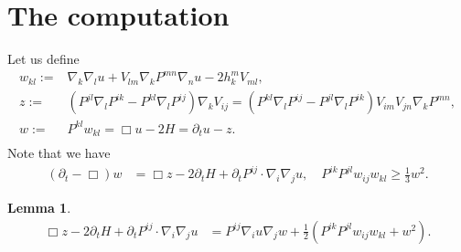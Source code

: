 \documentclass{amsart}
\newtheorem{lemma}[theorem]{Lemma}
\theoremstyle{definition}
\theoremstyle{remark}
\numberwithin{equation}{section}
\begin{document}
\section{The computation}
Let us define
\begin{align*}
w_{kl}:=&\nabla_k\nabla_lu+V_{lm}\nabla_kP^{mn}\nabla_nu-2h_k^mV_{ml},\\
z:=&\left(P^{jl}\nabla_lP^{ik}-P^{kl}\nabla_l P^{ij}\right)\nabla_kV_{ij}=\left(P^{kl}\nabla_l P^{ij}-P^{jl}\nabla_lP^{ik}\right)V_{im}V_{jn}\nabla_kP^{mn},\\
w:=&P^{kl}w_{kl}=\Box u-2H=\partial_tu-z.\\
\end{align*}
Note that we have
\begin{align}
(\partial_t-\Box)w
&=\Box z-2\partial_tH+\partial_tP^{ij}\cdot\nabla_i\nabla_ju,\quad P^{ik}P^{jl}w_{ij}w_{kl}\geq \frac{1}{3}w^2.
\end{align}
\begin{lemma}
\begin{align*}
\Box z-2\partial_tH+\partial_tP^{ij}\cdot\nabla_i\nabla_ju&=P^{ij}\nabla_i u\nabla_j w+ \frac{1}{2}\left(P^{ik}P^{jl}w_{ij}w_{kl}+w^2\right).\\
\end{align*}
\end{lemma}
\end{document}
